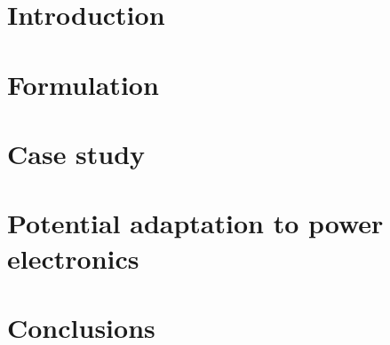 \documentclass[10pt, a4paper]{report}
\begin{document}
\tableofcontents{}

\chapter{Introduction}


\chapter{Formulation}


\chapter{Case study}


\chapter{Potential adaptation to power electronics}


\chapter{Conclusions}


\printbibliography
\end{document}
